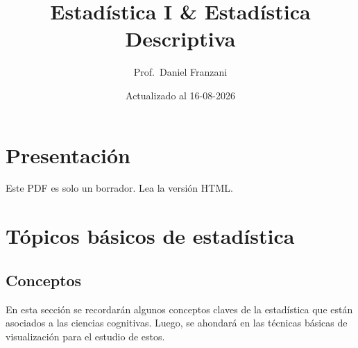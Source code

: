 \documentclass[
  11pt,
]{book}
\title{Estadística I \& Estadística Descriptiva}
\author{Prof.~Daniel Franzani}
\date{Actualizado al 16-08-2026}
\theoremstyle{definition}
\theoremstyle{definition}
\theoremstyle{definition}
\theoremstyle{definition}
\theoremstyle{remark}
\begin{document}
\maketitle

{
\setcounter{tocdepth}{3}
\tableofcontents
}
\chapter*{Presentación}\label{presetacion}

Este PDF es solo un borrador. Lea la versión HTML.

\chapter{Tópicos básicos de estadística}\label{unidad1}

\section{Conceptos}\label{topicos-conceptos}

En esta sección se recordarán algunos conceptos claves de la estadística que están asociados a las ciencias cognitivas. Luego, se ahondará en las técnicas básicas de visualización para el estudio de estos.
\end{document}
